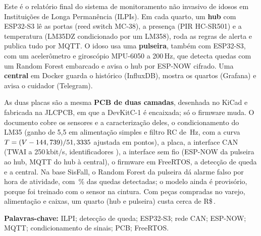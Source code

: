 Este é o relatório final do sistema de monitoramento não
invasivo de idosos em Instituições de Longa Permanência (ILPIs). Em cada quarto, um
\textbf{hub} com ESP32-S3 lê as portas (reed switch MC-38), a presença (PIR HC-SR501) e a
temperatura (LM35DZ condicionado por um LM358), roda as regras de alerta e publica tudo
por MQTT. O idoso usa uma \textbf{pulseira}, também com ESP32-S3, com um acelerômetro e
giroscópio MPU-6050 a 200\,Hz, que detecta quedas com um Random Forest embarcado e avisa
o hub por ESP-NOW cifrado. Uma \textbf{central} em Docker guarda o histórico (InfluxDB),
mostra os quartos (Grafana) e avisa o cuidador (Telegram).

As duas placas são a mesma \textbf{PCB de duas camadas}, desenhada no KiCad e fabricada
na JLCPCB, em que a DevKitC-1 é encaixada; só o firmware muda. O documento cobre os
sensores e a caracterização deles, o condicionamento do LM35 (ganho de 5,5 em
alimentação simples e filtro RC de \rcFc\,Hz, com a curva
$T = (V - 144,739)/51,3335$ ajustada em \lmPontos{} pontos), a placa, a
interface CAN (TWAI a 250\,kbit/s, identificadores ), a interface sem fio
(ESP-NOW da pulseira ao hub, MQTT do hub à central), o firmware em FreeRTOS, a detecção de
queda e a central. Na base SisFall, o Random Forest da pulseira dá \rfAlarmes{} alarme
falso por hora de atividade, com \rfSensEnsaio\,\% das quedas detectadas; o modelo ainda é
provisório, porque foi treinado com o sensor na cintura. Com peças compradas no varejo,
alimentação e caixas, um quarto (hub e pulseira) custa cerca de R\$\,\custoKit.

{\raggedright
\textbf{Palavras-chave:} ILPI; detecção de queda; ESP32-S3; rede CAN; ESP-NOW; MQTT;
condicionamento de sinais; PCB; FreeRTOS.\par}
